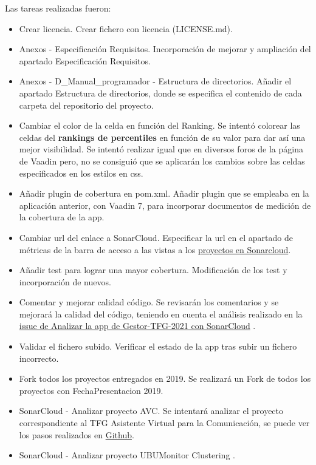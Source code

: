 Las tareas realizadas fueron:
\begin{itemize}
	\item Crear licencia.
		Crear fichero con licencia (LICENSE.md).
	\item Anexos - Especificación Requisitos.
		Incorporación de mejorar y ampliación del apartado Especificación Requisitos.
	\item Anexos - D\_Manual\_programador - Estructura de directorios.
		Añadir el apartado Estructura de directorios, donde se especifica el contenido de cada carpeta del repositorio del proyecto.
	\item Cambiar el color de la celda en función del Ranking.
		Se intentó colorear las celdas del \textbf{rankings de percentiles} en función de su valor para dar así una mejor visibilidad. Se intentó realizar igual que en diversos foros de la página de Vaadin pero, no se consiguió que se aplicarán los cambios sobre las celdas especificados en los estilos en css.
	\item Añadir plugin de cobertura en pom.xml.
		Añadir plugin que se empleaba en la aplicación anterior, con Vaadin 7, para incorporar documentos de medición de la cobertura de la app.
	\item Cambiar url del enlace a SonarCloud.
		Especificar la url en el apartado de métricas de la barra de acceso a las vistas a los \href{https://sonarcloud.io/organizations/dbo1001/projects}{proyectos en Sonarcloud}.
	\item Añadir test para lograr una mayor cobertura.
		Modificación de los test y incorporación de nuevos.
	\item Comentar y mejorar calidad código.
		Se revisarán los comentarios y se mejorará la calidad del código, teniendo en cuenta el análisis realizado en la \href{https://github.com/dbo1001/Gestor-TFG-2021/issues/142}{issue de Analizar la app de Gestor-TFG-2021 con SonarCloud} . 
	\item Validar el fichero subido.
		Verificar el estado de la app tras subir un fichero incorrecto.
	\item Fork todos los proyectos entregados en 2019.
		Se realizará un Fork de todos los proyectos con FechaPresentacion 2019.
	\item SonarCloud - Analizar proyecto AVC.
		Se intentará analizar el proyecto correspondiente al TFG Asistente Virtual para la Comunicación, se puede ver los pasos realizados en \href{https://github.com/dbo1001/Gestor-TFG-2021/issues/147}{Github}.
	\item SonarCloud - Analizar proyecto UBUMonitor Clustering .

\end{itemize}
